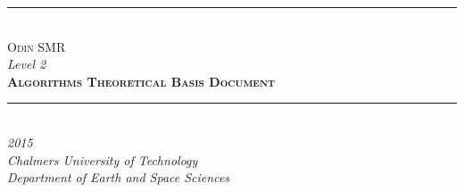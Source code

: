 \begin{titlepage}
\center
\noindent\rule{12cm}{0.4pt} \\
{\huge \scshape Odin SMR \\}
{\huge {\it Level 2} \\}
{\Huge\scshape {\bf Algorithms Theoretical Basis Document}\\[.2in]}
\noindent\rule{12cm}{0.4pt} \\
\vfill
{\itshape 2015 \\ Chalmers University of Technology \\ Department of Earth and Space Sciences}
\end{titlepage}